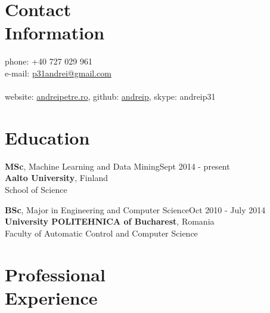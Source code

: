 \documentclass[margin,line]{resume}
\begin{document}
\begin{resume}

    \section{\mysidestyle Contact\\Information}

    phone: +40 727 029 961              \\
    e-mail:  \href{mailto:p31andrei@gmail.com}{p31andrei@gmail.com}  \vspace{0mm}\\\vspace{-4.5mm}\\%
    website: \href{http://andreipetre.ro}{andreipetre.ro}, github: \href{https://github.com/andreip/}{andreip}, skype: andreip31

    \section{\mysidestyle Education}

    \textbf{MSc}, Machine Learning and Data Mining\hfill Sept 2014 - present\\
    \textbf{Aalto University}, Finland\\
    School of Science

    \textbf{BSc}, Major in Engineering and Computer Science\hfill Oct 2010 - July 2014\\
    \textbf{University POLITEHNICA of Bucharest}, Romania\\
    Faculty of Automatic Control and Computer Science

    \section{\mysidestyle Professional\\Experience}


\end{resume}
\end{document}
